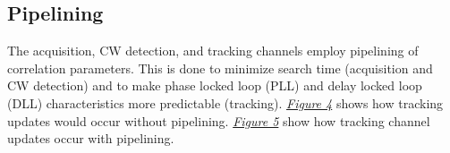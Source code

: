\documentclass{article}
\begin{document}
\begin{multicols}{2}
\subsection{Pipelining}
The acquisition, CW detection, and tracking channels employ pipelining of correlation parameters. This is done to minimize search time (acquisition and CW detection) and to make phase locked loop (PLL) and delay locked loop (DLL) characteristics more predictable (tracking). \hyperlink{fig4}{\it Figure 4} shows how tracking updates would occur without pipelining. \hyperlink{fig5}{\it Figure 5} show how tracking channel updates occur with pipelining. \\
\end{multicols}

\hypertarget{fig4}{}
\begin{center}


\end{center}
\end{document}
